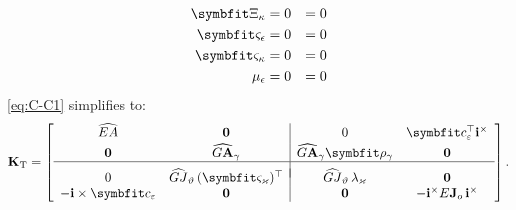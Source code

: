 \[
\begin{aligned}
\ShiftA &= 0 &= 0 \\
\ShiftN &= 0 &= 0 \\
\ShiftF &= 0 &= 0 \\
\ShiftScaleN &= 0 &= 0\\
\end{aligned}
\]
\eqref{eq:C-C1} simplifies to:
\begin{equation}
\TraceStiffNM 
=
\left[\begin{array}{cc|cc}
\AxialRigidity
& \mathbf{0}
& 0
& \AxialCoupling^\top\FrameBasis^\times
\\[2pt]
\mathbf{0} &
\TraceShearRigidity &
\TraceShearRigidity\TraceShearOrigin &
\mathbf{0}
\\ \hline &&& \\[-7pt] 
0 &
\TwistRigidity\,(\ShiftT)^\top
& \TwistRigidity\,\ShiftScaleT &
\mathbf{0}
\\ %
-\FrameBasis\times\AxialCoupling 
& \mathbf{0}
& \mathbf{0}
&
- \FrameBasis^\times E\IntRoR\,\FrameBasis^\times
\end{array}\right].
\end{equation}